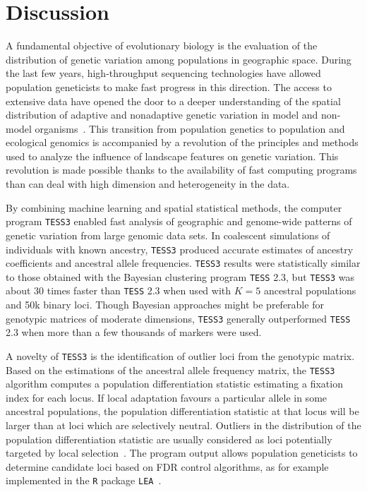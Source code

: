 



\section{Discussion}


A fundamental objective of evolutionary biology is the evaluation of the distribution of genetic variation among populations in geographic space. During the last few years, high-throughput sequencing technologies have allowed population geneticists to make fast progress in this direction. The access to extensive data have opened the door to a deeper understanding of the spatial distribution of adaptive and nonadaptive genetic variation in model and non-model organisms~\citep{manel2010perspectives}. This transition from population genetics to population and ecological genomics is accompanied by a revolution of the principles and methods used to analyze the influence of landscape features on genetic variation. This revolution is made possible thanks to the availability of fast computing programs than can deal with high dimension and heterogeneity in the data. 


 By combining machine learning and spatial statistical methods, the computer program {\tt TESS3} enabled fast analysis of geographic and genome-wide patterns of genetic variation from large genomic data sets. In coalescent simulations of individuals with known ancestry, {\tt TESS3} produced accurate estimates of ancestry coefficients and ancestral allele frequencies. {\tt TESS3} results were statistically similar to those obtained with the Bayesian clustering program {\tt TESS} 2.3, but {\tt TESS3} was about 30 times faster than {\tt TESS} 2.3 when used with $K = 5$ ancestral populations and 50k binary loci. Though Bayesian approaches might be preferable for genotypic matrices of moderate dimensions, {\tt TESS3} generally outperformed {\tt TESS} 2.3 when more than a few thousands of markers were used.

A novelty of {\tt TESS3} is the identification of outlier loci from the genotypic matrix. Based on the estimations of the ancestral allele frequency matrix, the {\tt TESS3} algorithm computes a population differentiation statistic estimating a fixation index for each locus. If local adaptation favours a particular allele in some ancestral populations, the population differentiation statistic  at that locus will be larger than at loci which are selectively neutral. Outliers in the distribution of the population differentiation statistic are usually considered as loci potentially targeted by local selection~\citep{holsinger2009genetics}. The program output allows population geneticists to determine candidate loci based on FDR control algorithms, as for example implemented in the  {\tt R} package {\tt LEA}~\citep{frichot2015lea}. 

